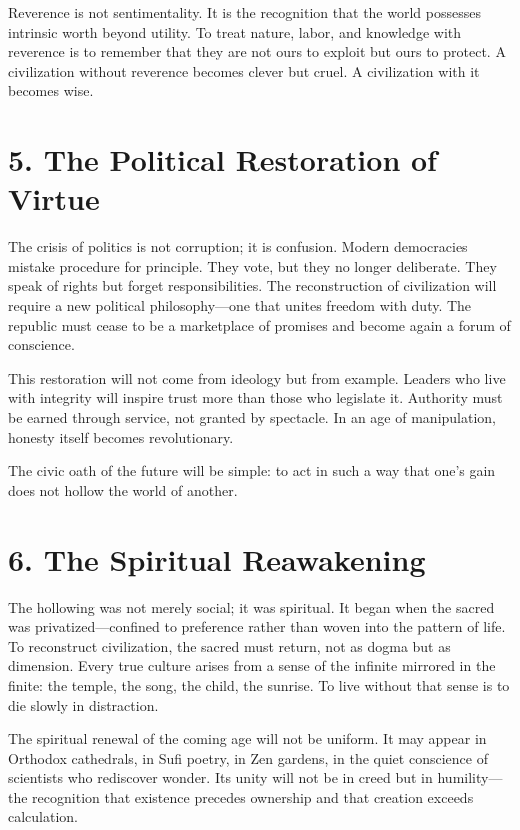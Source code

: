 \documentclass[11pt,twoside]{book}
\begin{document}
Reverence is not sentimentality.  
It is the recognition that the world possesses intrinsic worth beyond utility.  
To treat nature, labor, and knowledge with reverence is to remember that they are not ours to exploit but ours to protect.  
A civilization without reverence becomes clever but cruel.  
A civilization with it becomes wise.

\section*{5. The Political Restoration of Virtue}

The crisis of politics is not corruption; it is confusion.  
Modern democracies mistake procedure for principle.  
They vote, but they no longer deliberate.  
They speak of rights but forget responsibilities.  
The reconstruction of civilization will require a new political philosophy—one that unites freedom with duty.  
The republic must cease to be a marketplace of promises and become again a forum of conscience.

This restoration will not come from ideology but from example.  
Leaders who live with integrity will inspire trust more than those who legislate it.  
Authority must be earned through service, not granted by spectacle.  
In an age of manipulation, honesty itself becomes revolutionary.

The civic oath of the future will be simple: to act in such a way that one’s gain does not hollow the world of another.

\section*{6. The Spiritual Reawakening}

The hollowing was not merely social; it was spiritual.  
It began when the sacred was privatized—confined to preference rather than woven into the pattern of life.  
To reconstruct civilization, the sacred must return, not as dogma but as dimension.  
Every true culture arises from a sense of the infinite mirrored in the finite: the temple, the song, the child, the sunrise.  
To live without that sense is to die slowly in distraction.

The spiritual renewal of the coming age will not be uniform.  
It may appear in Orthodox cathedrals, in Sufi poetry, in Zen gardens, in the quiet conscience of scientists who rediscover wonder.  
Its unity will not be in creed but in humility—the recognition that existence precedes ownership and that creation exceeds calculation.
\end{document}
